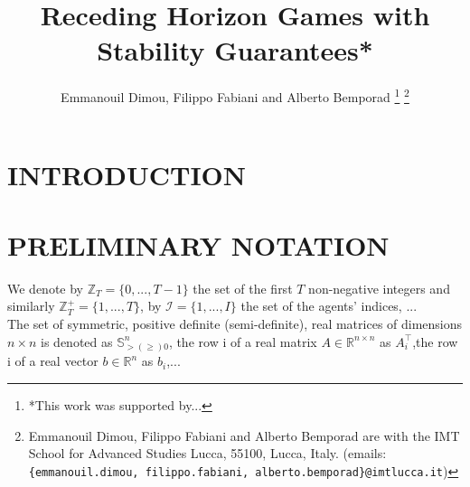 \documentclass[letterpaper, 10 pt, conference]{ieeeconf}  %
\title{\LARGE \bf
Receding Horizon Games with Stability Guarantees*
}
\author{Emmanouil Dimou, Filippo Fabiani and Alberto Bemporad%
\thanks{*This work was supported by...}%
\thanks{Emmanouil Dimou, Filippo Fabiani and Alberto Bemporad are with the IMT School for Advanced Studies Lucca,
        55100, Lucca, Italy. (emails: {\tt\small \{emmanouil.dimou, filippo.fabiani, alberto.bemporad\}@imtlucca.it})}%
}
\begin{document}
\maketitle
\thispagestyle{empty}
\pagestyle{empty}

\begin{abstract}


\end{abstract}


\section{INTRODUCTION}

\section{PRELIMINARY NOTATION}
We denote by $\mathbb{Z}_{T} = \{0,...,T-1\}$ the set of the first $T$ non-negative integers and similarly $\mathbb{Z}^{+}_{T} = \{1,...,T\}$, by $\mathcal{I} = \{1,...,I\}$ the set of the agents' indices, ...\\
The set of symmetric, positive definite (semi-definite), real matrices of dimensions $n \times n$ is denoted as $\mathbb{S}^{n}_{> (\geq) 0}$, the row i of a real matrix $A \in \mathbb{R}^{n \times n}$ as $A^{\top}_{i}$,the row i of a real vector $b \in \mathbb{R}^{n}$ as $b_{i}$,...\\
\end{document}
